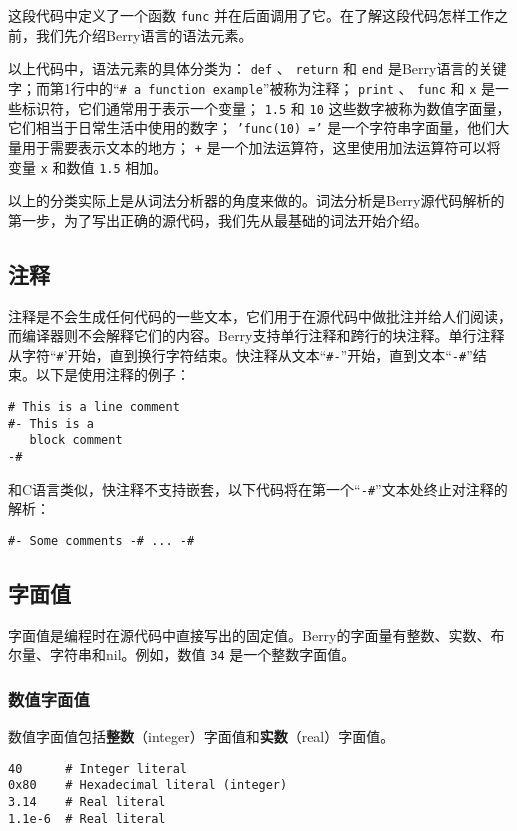 这段代码中定义了一个函数 \texttt{func} 并在后面调用了它。在了解这段代码怎样工作之前，我们先介绍Berry语言的语法元素。

以上代码中，语法元素的具体分类为： \texttt{def} 、 \texttt{return} 和 \texttt{end} 是Berry语言的关键字；而第1行中的``\texttt{\# a function example}''被称为注释； \texttt{print} 、 \texttt{func} 和 \texttt{x} 是一些标识符，它们通常用于表示一个变量； \texttt{1.5} 和 \texttt{10} 这些数字被称为数值字面量，它们相当于日常生活中使用的数字； \texttt{'func(10) ='} 是一个字符串字面量，他们大量用于需要表示文本的地方； \texttt{+} 是一个加法运算符，这里使用加法运算符可以将变量 \texttt{x} 和数值 \texttt{1.5} 相加。

以上的分类实际上是从词法分析器的角度来做的。词法分析是Berry源代码解析的第一步，为了写出正确的源代码，我们先从最基础的词法开始介绍。

\subsection{注释}

注释是不会生成任何代码的一些文本，它们用于在源代码中做批注并给人们阅读，而编译器则不会解释它们的内容。Berry支持单行注释和跨行的块注释。单行注释从字符``\texttt{\#}'开始，直到换行字符结束。快注释从文本``\texttt{\#-}''开始，直到文本``\texttt{-\#}''结束。以下是使用注释的例子：
\begin{lstlisting}[language=berry, numbers=none]
# This is a line comment
#- This is a
   block comment
-#
\end{lstlisting}

和C语言类似，快注释不支持嵌套，以下代码将在第一个``\texttt{-\#}''文本处终止对注释的解析：
\begin{lstlisting}[language=berry, numbers=none]
#- Some comments -# ... -#
\end{lstlisting}

\subsection{字面值}

字面值是编程时在源代码中直接写出的固定值。Berry的字面量有整数、实数、布尔量、字符串和nil。例如，数值 \texttt{34} 是一个整数字面值。

\subsubsection{数值字面值}

数值字面值包括\textbf{整数}（integer）字面值和\textbf{实数}（real）字面值。
\begin{lstlisting}[language=berry, numbers=none]
40      # Integer literal
0x80    # Hexadecimal literal (integer)
3.14    # Real literal
1.1e-6  # Real literal
\end{lstlisting}

